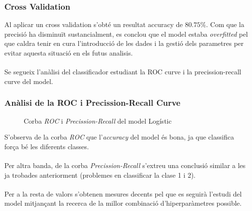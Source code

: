 \documentclass[a4paper, 11pt]{article}
\begin{document}
\subsubsection{Cross Validation}
Al aplicar un cross validation  s’obté un resultat accuracy
de $80.75\%$. Com que la precisió ha disminuït sustancialment, es conclou que el model estaba \textit{overfitted} pel que caldra tenir en cura l'introducció de les dades i la gestió dels parametres per evitar aquesta situació en els futus analisis.\\\\
Se segueix l’anàlisi del classificador estudiant la ROC curve i la precission-recall curve
del model.

\newpage
\subsubsection{Anàlisi de la ROC i Precission-Recall Curve} \label{ROC_Random}
\begin{figure}[h]
\centering
    \caption{Corba \textit{ROC} i \textit{Precission-Recall} del model Logístic}
    \label{fig:my_label}
\end{figure}
\hspace{-1.6em}S'observa de la corba \textit{ROC} que l'\textit{accuracy} del model és bona, ja que classifica força bé les diferents classes.\\\\
Per altra banda, de la corba \textit{Precission-Recall} s'extreu una conclusió similar a les ja trobades anteriorment (problemes en classificar la clase 1 i 2).\\\\ Per a la resta de valors s'obtenen mesures decents pel que es seguirà l'estudi del model mitjançant la recerca de la millor combinació d'hiperparàmetres possible.
\end{document}
